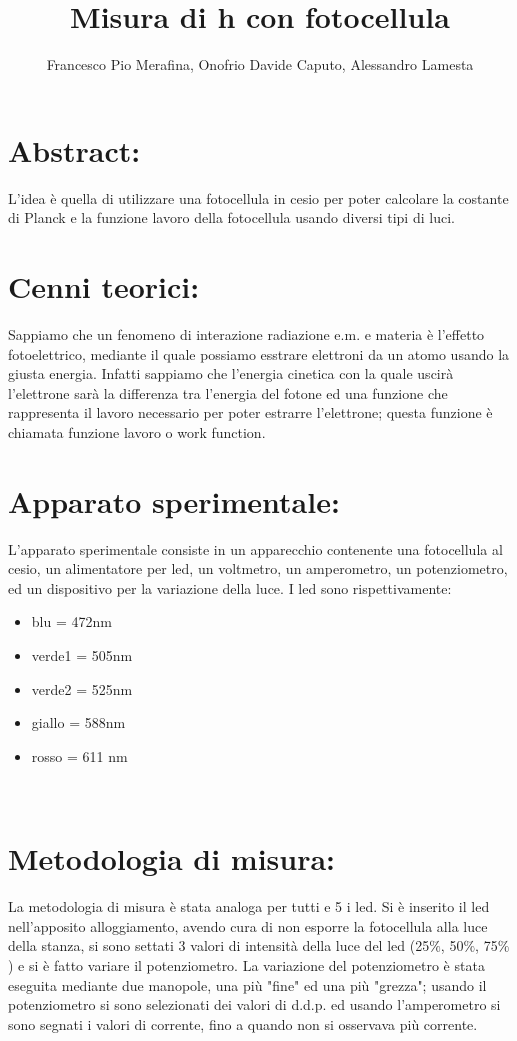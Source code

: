 \documentclass{article}
\title{Misura di h con fotocellula}
\author{Francesco Pio Merafina, Onofrio Davide Caputo, Alessandro Lamesta}
\date{}
\begin{document}
\maketitle
\section{Abstract:}
L'idea è quella di utilizzare una fotocellula in cesio per poter calcolare la costante di Planck e la funzione lavoro della fotocellula usando diversi tipi di luci.
~
\section{Cenni teorici:}
Sappiamo che un fenomeno di interazione radiazione e.m. e materia è l'effetto fotoelettrico, mediante il quale possiamo esstrare elettroni da un atomo usando la giusta energia. Infatti sappiamo che l'energia cinetica con la quale uscirà l'elettrone sarà la differenza tra l'energia del fotone ed una funzione che rappresenta il lavoro necessario per poter estrarre l'elettrone; questa funzione è chiamata funzione lavoro o work function.
~
\section{Apparato sperimentale:}
L'apparato sperimentale consiste in un apparecchio contenente una fotocellula al cesio, un alimentatore per led, un voltmetro, un amperometro, un potenziometro, ed un dispositivo per la variazione della luce. I led sono rispettivamente:
\begin{itemize}
    \item blu = 472nm
    \item verde1 = 505nm
    \item verde2 = 525nm
    \item giallo = 588nm
    \item rosso = 611 nm
\end{itemize}
~
\section{Metodologia di misura:}
La metodologia di misura è stata analoga per tutti e 5 i led. Si è inserito il led nell'apposito alloggiamento, avendo cura di non esporre la fotocellula alla luce della stanza, si sono settati 3 valori di intensità della luce del led (25$\%$, 50$\%$, 75$\%$) e si è fatto variare il potenziometro. La variazione del potenziometro è stata eseguita mediante due manopole, una più "fine" ed una più "grezza"; usando il potenziometro si sono selezionati dei valori di d.d.p. ed usando l'amperometro si sono segnati i valori di corrente, fino a quando non si osservava più corrente.
~
\end{document}
